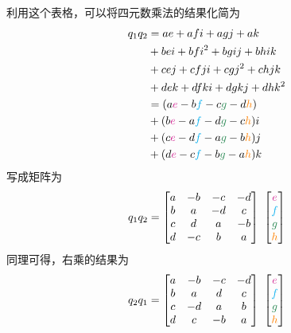 \summarize[
\hspace{1em} 记忆方法：类似于向量的叉乘，将$i,j,k$理解为三维右手坐标系，则$i \times j =k , j \times i = -k$，其余类似。
]

利用这个表格，可以将四元数乘法的结果化简为
\begin{align}
	q_1 q_2 & = ae + afi + agj + ak \notag \\
& + bei + bfi^2 + bgij + bhik \notag \\
& + cej + cfji + cgj^2 + chjk \notag \\
& + dek + dfki + dgkj + dhk^2 \notag \\
& = (a {\color{VioletRed} e} - b {\color{cyan} f} - c{\color{SeaGreen} g} - d{\color{orange} h}) \notag \\
& + (b {\color{VioletRed} e} - a {\color{cyan} f} - d{\color{SeaGreen} g} - c{\color{orange} h}) i \notag \\
& + (c {\color{VioletRed} e} - d {\color{cyan} f} - a{\color{SeaGreen} g} - b{\color{orange} h}) j \notag \\
& + (d {\color{VioletRed} e} - c {\color{cyan} f} - b{\color{SeaGreen} g} - a{\color{orange} h}) k
\end{align}
写成矩阵为
\begin{equation}
		q_1 q_2 = 
		\begin{bmatrix}
			a & -b & -c & -d \\
			b & a & -d & c \\
			c & d & a & -b \\
			d & -c & b & a
		\end{bmatrix}
		\,\, 
		\begin{bmatrix}
		 {\color{VioletRed} e} \\
		 {\color{cyan} f} \\
		 {\color{SeaGreen} g} \\
		 {\color{orange} h} 
		\end{bmatrix}
\end{equation}
同理可得，右乘的结果为
\begin{equation}
	q_2 q_1 = 
	\begin{bmatrix}
		a & -b & -c & -d \\
		b & a & d & c \\
		c & -d & a & b \\
		d & c & -b & a
	\end{bmatrix}
	\,\, 
	\begin{bmatrix}
		{\color{VioletRed} e} \\
		{\color{cyan} f} \\
		{\color{SeaGreen} g} \\
		{\color{orange} h} 
	\end{bmatrix}
\end{equation}
\vspace*{0.5em}


